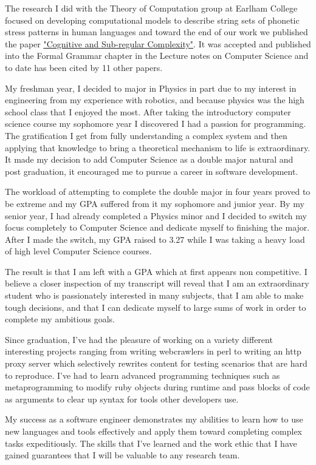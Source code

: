 \documentclass{article}
\begin{document}
The research I did with the Theory of Computation group at Earlham College focused on developing computational models to describe string sets of phonetic stress patterns in human languages and toward the end of our work we published the paper \href{http://link.springer.com/chapter/10.1007/978-3-642-39998-5_6}{"Cognitive and Sub-regular Complexity"}. It was accepted and published into the Formal Grammar chapter in the Lecture notes on Computer Science and to date has been cited by 11 other papers.

My freshman year, I decided to major in Physics in part due to my interest in engineering from my experience with robotics, and because physics was the high school class that I enjoyed the most. After taking the introductory computer science course my sophomore year I discovered I had a passion for programming. The gratification I get from fully understanding a complex system and then applying that knowledge to bring a theoretical mechanism to life is extraordinary. It made my decision to add Computer Science as a double major natural and post graduation, it encouraged me to pursue a career in software development.

The workload of attempting to complete the double major in four years proved to be extreme and my GPA suffered from it my sophomore and junior year. By my senior year, I had already completed a Physics minor and I decided to switch my focus completely to Computer Science and dedicate myself to finishing the major. After I made the switch, my GPA raised to 3.27 while I was taking a heavy load of high level Computer Science courses.

The result is that I am left with a GPA which at first appears non competitive. I believe a closer inspection of my transcript will reveal that I am an extraordinary student who is passionately interested in many subjects, that I am able to make tough decisions, and that I can dedicate myself to large sums of work in order to complete my ambitious goals.

Since graduation, I've had the pleasure of working on a variety different interesting projects ranging from writing webcrawlers in perl to writing an http proxy server which selectively rewrites content for testing scenarios that are hard to reproduce. I've had to learn advanced programming techniques such as metaprogramming to modify ruby objects during runtime and pass blocks of code as arguments to clear up syntax for tools other developers use.

My success as a software engineer demonstrates my abilities to learn how to use new languages and tools effectively and apply them toward completing complex tasks expeditiously. The skills that I've learned and the work ethic that I have gained guarantees that I will be valuable to any research team. 
\end{document}

